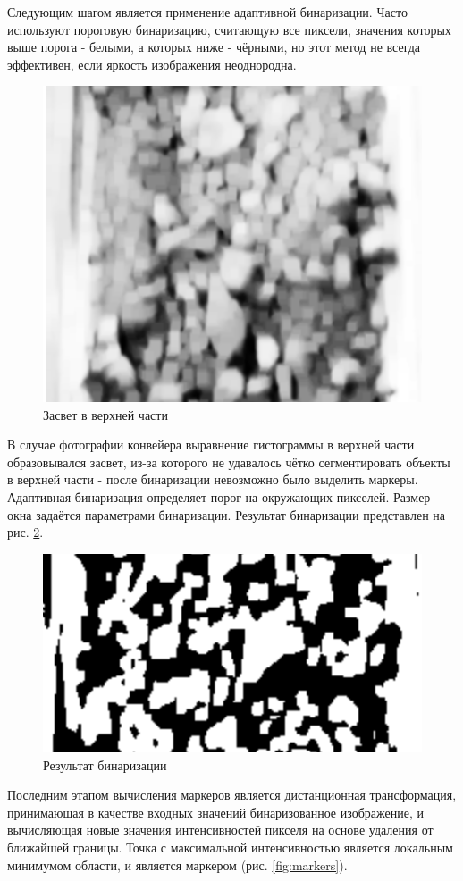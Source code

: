\documentclass[times]{itmo-student-thesis}
\begin{document}
Следующим шагом является применение адаптивной бинаризации. Часто используют пороговую бинаризацию, считающую все пиксели, значения которых выше порога - белыми, а которых ниже - чёрными, но этот метод не всегда эффективен, если яркость изображения неоднородна.

\begin{figure}[h!]
	\centering
	\includegraphics[width=0.5\linewidth]{images/overlightning}
	\caption{Засвет в верхней части}
	\label{fig:overlightning}
\end{figure}


 В случае фотографии конвейера выравнение гистограммы в верхней части образовывался засвет, из-за которого не удавалось чётко сегментировать объекты в верхней части - после бинаризации невозможно было выделить маркеры. Адаптивная бинаризация определяет порог на окружающих пикселей. Размер окна задаётся параметрами бинаризации. Результат бинаризации представлен на рис. \ref{fig:binary}. 


\begin{figure}[h!]
	\centering
	\includegraphics[width=0.6\linewidth]{images/binary}
	\caption{Результат бинаризации}
	\label{fig:binary}
\end{figure}


Последним этапом вычисления маркеров является дистанционная трансформация, принимающая в качестве входных значений бинаризованное изображение, и вычисляющая новые значения интенсивностей пикселя на основе удаления от ближайшей границы. Точка с максимальной интенсивностью является локальным минимумом области, и является маркером (рис. \ref{fig:markers}).  
\end{document}

